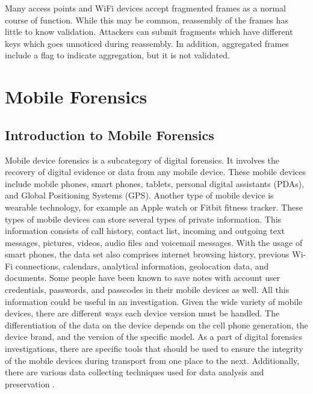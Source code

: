 \documentclass[acmlarge]{acmart}
\begin{document}
Many access points and WiFi devices accept fragmented frames as a normal course of function. While this may be common, reassembly of the frames has little to know validation. Attackers can submit fragments which have different keys which goes unnoticed during reassembly. In addition, aggregated frames include a flag to indicate aggregation, but it is not validated.



\section{Mobile Forensics}
\subsection{Introduction to Mobile Forensics}
Mobile device forensics is a subcategory of digital forensics.  It involves the recovery of digital evidence or data from any mobile device.  These mobile devices include mobile phones, smart phones, tablets, personal digital assistants (PDAs), and Global Positioning Systems (GPS).  Another type of mobile device is wearable technology, for example an Apple watch or Fitbit fitness tracker.  These types of mobile devices can store several types of private information.  This information consists of call history, contact list, incoming and outgoing text messages, pictures, videos, audio files and voicemail messages. With the usage of smart phones, the data set also comprises internet browsing history, previous Wi-Fi connections, calendars, analytical information, geolocation data, and documents.  Some people have been known to save notes with account user credentials, passwords, and passcodes in their mobile devices as well.  All this information could be useful in an investigation.  Given the wide variety of mobile devices, there are different ways each device version must be handled.  The differentiation of the data on the device depends on the cell phone generation, the device brand, and the version of the specific model.  As a part of digital forensics investigations, there are specific tools that should be used to ensure the integrity of the mobile devices during transport from one place to the next.  Additionally, there are various data collecting techniques used for data analysis and preservation \cite{duc_2015}.
\end{document}
